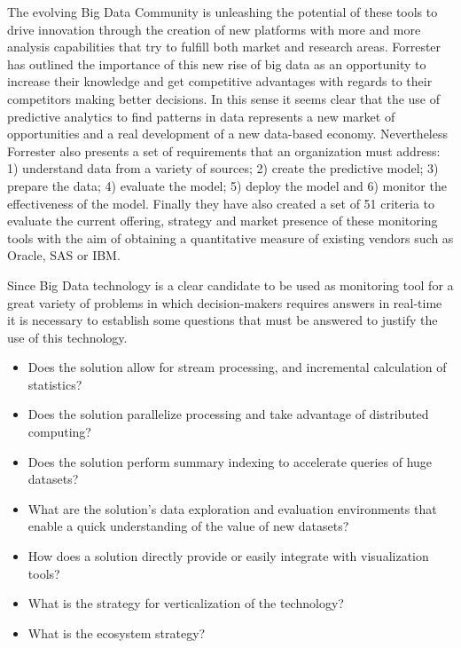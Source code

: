 The evolving Big Data Community is unleashing the potential of these tools 
to drive innovation through the creation of new platforms with more 
and more analysis capabilities that try to fulfill both market 
and research areas. Forrester has outlined the importance of 
this new rise of big data as an opportunity to increase their knowledge 
and get competitive advantages with regards to their competitors making 
better decisions. In this sense it seems clear that the use of 
predictive analytics to find patterns in data represents a new 
market of opportunities and a real development of a 
new data-based economy. Nevertheless Forrester also presents a set 
of requirements that an organization must address: 
1) understand data from a variety of sources; 2) create the predictive model; 
3) prepare the data; 4) evaluate the model; 5) deploy the model and 
6) monitor the effectiveness of the model. Finally they have also created 
a set of 51 criteria to evaluate the current offering, strategy 
and market presence of these monitoring tools with the aim of 
obtaining a quantitative measure of existing vendors such as 
Oracle, SAS or IBM.

Since Big Data technology is a clear candidate to be used as monitoring tool 
for a great variety of problems in which decision-makers requires answers 
in real-time it is necessary to establish some questions that must be 
answered to justify the use of this technology.
\begin{itemize}
 \item Does the solution allow for stream processing, and incremental calculation of statistics?
 \item Does the solution parallelize processing and take advantage of distributed computing?
 \item Does the solution perform summary indexing to accelerate queries of huge datasets?
 \item What are the solution's data exploration and evaluation environments that enable a quick understanding of the value of new datasets?
 \item How does a solution directly provide or easily integrate with visualization tools?
 \item What is the strategy for verticalization of the technology?
 \item What is the ecosystem strategy? 
\end{itemize}



% 
% 
% 
% 
